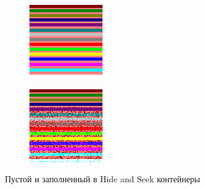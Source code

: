 \begin{figure}
     \centering
     \hspace*{\fill}%
     \begin{subfigure}[b]{0.3\textwidth}
         \centering
         \includegraphics[width=\textwidth]{include/graphics/hide_and_seek_before}
     \end{subfigure}
     \hfill
     \begin{subfigure}[b]{0.3\textwidth}
         \centering
         \includegraphics[width=\textwidth]{include/graphics/hide_and_seek_after}
     \end{subfigure}
     \hspace*{\fill}%
     \caption{Пустой и заполненный в Hide and Seek контейнеры}
     \label{fig:HideAndSeek}
\end{figure}

